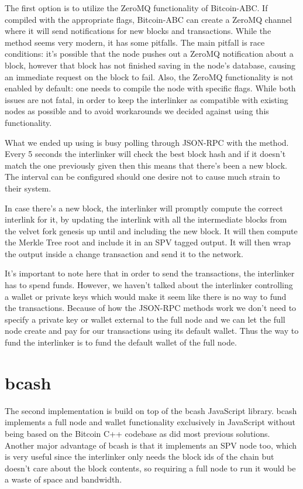 The first option is to utilize the ZeroMQ functionality of Bitcoin-ABC. If compiled with the appropriate flags, Bitcoin-ABC can create a ZeroMQ channel where it will send notifications for new blocks and transactions. While the method seems very modern, it has some pitfalls. The main pitfall is race conditions: it's possible that the node pushes out a ZeroMQ notification about a block, however that block has not finished saving in the node's database, causing an immediate  request on the block to fail. Also, the ZeroMQ functionality is not enabled by default: one needs to compile the node with specific flags. While both issues are not fatal, in order to keep the interlinker as compatible with existing nodes as possible and to avoid workarounds we decided against using this functionality.

What we ended up using is busy polling through JSON-RPC with the  method. Every 5 seconds the interlinker will check the best block hash and if it doesn't match the one previously given then this means that there's been a new block. The interval can be configured should one desire not to cause much strain to their system.

In case there's a new block, the interlinker will promptly compute the correct interlink for it, by updating the interlink with all the intermediate blocks from the velvet fork genesis up until and including the new block. It will then compute the Merkle Tree root and include it in an SPV tagged output. It will then wrap the output inside a change transaction and send it to the network.

It's important to note here that in order to send the transactions, the interlinker has to spend funds. However, we haven't talked about the interlinker controlling a wallet or private keys which would make it seem like there is no way to fund the transactions. Because of how the JSON-RPC methods work we don't need to specify a private key or wallet external to the full node and we can let the full node create and pay for our transactions using its default wallet. Thus the way to fund the interlinker is to fund the default wallet of the full node.

\section{bcash}
The second implementation is build on top of the bcash JavaScript library. bcash implements a full node and wallet functionality exclusively in JavaScript without being based on the Bitcoin C++ codebase as did most previous solutions. Another major advantage of bcash is that it implements an SPV node too, which is very useful since the interlinker only needs the block ids of the chain but doesn't care about the block contents, so requiring a full node to run it would be a waste of space and bandwidth.
